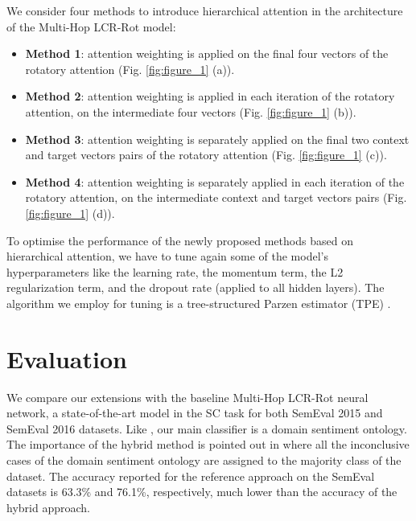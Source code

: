 \documentclass[hidelinks]{llncs}
\begin{document}
We consider four methods to introduce hierarchical attention in the architecture of the Multi-Hop LCR-Rot model:
\begin{itemize}


    \item \textbf{Method 1}: attention weighting is applied on the final four vectors of the rotatory attention (Fig. \ref{fig:figure_1} (a)).
    \item \textbf{Method 2}: attention weighting is applied in each iteration of the rotatory attention, on the intermediate four vectors (Fig. \ref{fig:figure_1} (b)).
    \item \textbf{Method 3}: attention weighting is separately applied on the final two context and target vectors pairs of the rotatory attention (Fig. \ref{fig:figure_1} (c)).
    \item \textbf{Method 4}: attention weighting is separately applied in each iteration of the rotatory attention, on the intermediate context and target vectors pairs (Fig. \ref{fig:figure_1} (d)).
\end{itemize}

To optimise the performance of the newly proposed methods based on hierarchical attention, we have to tune again some of the model's hyperparameters like the learning rate, the momentum term, the L2 regularization term, and the dropout rate (applied to all hidden layers). The algorithm we employ for tuning is a tree-structured Parzen estimator (TPE) \cite{bergstra2011algorithms}.

\section{Evaluation}\label{Evaluation}

We compare our extensions with the baseline Multi-Hop LCR-Rot neural network, a state-of-the-art model in the SC task for both SemEval 2015 and SemEval 2016 datasets. Like \cite{wallaart2019hybrid}, our main classifier is a domain sentiment ontology. The importance of the hybrid method is pointed out in \cite{schouten2018ontology} where all the inconclusive cases of the domain sentiment ontology are assigned to the majority class of the dataset. The accuracy reported for the reference approach on the SemEval datasets is 63.3\% and 76.1\%, respectively, much lower than the accuracy of the hybrid approach.
\end{document}
